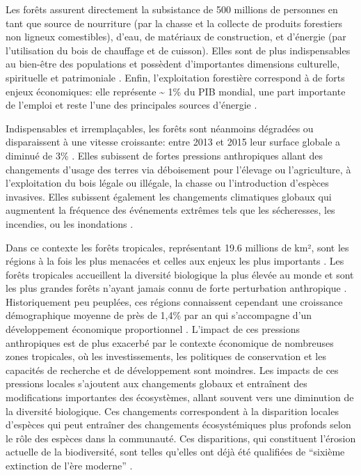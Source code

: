 \documentclass[
  11pt,
  french,
  A4paper,
  extrafontsizes,onecolumn,openright
  ]{memoir}
\begin{document}
Les forêts assurent directement la subsistance de 500 millions de
personnes en tant que source de nourriture (par la chasse et la collecte
de produits forestiers non ligneux comestibles), d'eau, de matériaux de
construction, et d'énergie (par l'utilisation du bois de chauffage et de
cuisson). Elles sont de plus indispensables au bien-être des populations
et possèdent d'importantes dimensions culturelle, spirituelle et
patrimoniale \autocites{FRA2015}{Tilman2014}. Enfin, l'exploitation
forestière correspond à de forts enjeux économiques: elle représente
\textasciitilde{} 1\% du PIB mondial, une part importante de l'emploi et
reste l'une des principales sources d'énergie
\autocites{CBDdiversity2011}{FAO2014}.

Indispensables et irremplaçables, les forêts sont néanmoins dégradées ou
disparaissent à une vitesse croissante: entre 2013 et 2015 leur surface
globale a diminué de 3\% \autocite{FAO2009}. Elles subissent de fortes
pressions anthropiques allant des changements d'usage des terres via
déboisement pour l'élevage ou l'agriculture, à l'exploitation du bois
légale ou illégale, la chasse ou l'introduction d'espèces invasives.
Elles subissent également les changements climatiques globaux qui
augmentent la fréquence des événements extrêmes tels que les
sécheresses, les incendies, ou les inondations
\autocite{Pachauri2014}.\newline

Dans ce contexte les forêts tropicales, représentant 19.6 millions de
km², sont les régions à la fois les plus menacées et celles aux enjeux
les plus importants \autocite{Barlow2018}. Les forêts tropicales
accueillent la diversité biologique la plus élevée au monde et sont les
plus grandes forêts n'ayant jamais connu de forte perturbation
anthropique \autocites{Gentry1988}{FAO2011}. Historiquement peu
peuplées, ces régions connaissent cependant une croissance démographique
moyenne de près de 1,4\% par an qui s'accompagne d'un développement
économique proportionnel \autocite{Asner2009}. L'impact de ces pressions
anthropiques est de plus exacerbé par le contexte économique de
nombreuses zones tropicales, où les investissements, les politiques de
conservation et les capacités de recherche et de développement sont
moindres. Les impacts de ces pressions locales s'ajoutent aux
changements globaux et entraînent des modifications importantes des
écosystèmes, allant souvent vers une diminution de la diversité
biologique. Ces changements correspondent à la disparition locales
d'espèces qui peut entraîner des changements écosystémiques plus
profonds selon le rôle des espèces dans la communauté. Ces disparitions,
qui constituent l'érosion actuelle de la biodiversité, sont telles
qu'elles ont déjà été qualifiées de ``sixième extinction de l'ère
moderne'' \autocites{Vitousek1997}{Cardinale2012}.
\end{document}
